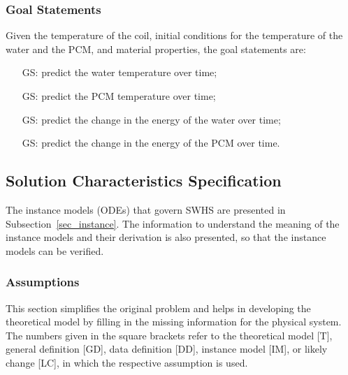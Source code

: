\documentclass[12pt]{article}
\newcounter{goalnum} %
\newcommand{\progname}{SWHS}
\begin{document}
\subsubsection{Goal Statements}

\noindent Given the temperature of the coil, initial conditions for the temperature of 
the water and the PCM, and material properties, the goal statements are:

\begin{itemize}

\item[GS\refstepcounter{goalnum}\thegoalnum \label{G_wtemp}:] predict the water 
temperature over time;

\item[GS\refstepcounter{goalnum}\thegoalnum \label{G_ptemp}:] predict the PCM 
temperature over time;
	
\item[GS\refstepcounter{goalnum}\thegoalnum \label{G_wenergy}:] predict the 
change in the energy of the
  water over time;

\item[GS\refstepcounter{goalnum}\thegoalnum \label{G_penergy}:] predict the 
change in the energy of the PCM over time.

\end{itemize}

\subsection{Solution Characteristics Specification}

The instance models (ODEs) that govern \progname{} are presented in
Subsection~\ref{sec_instance}.  The information to understand the meaning of the
instance models and their derivation is also presented, so that the instance
models can be verified.

\subsubsection{Assumptions}

This section simplifies the original problem and helps in developing the
theoretical model by filling in the missing information for the physical
system. The numbers given in the square brackets refer to the theoretical model
[T], general definition [GD], data definition [DD], instance model [IM], or
likely change [LC], in which the respective assumption is used.
\end{document}
